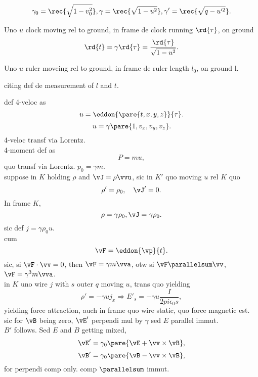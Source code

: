 \documentclass{ctexart}
\begin{document}
\[ \gamma_0 = \rec{\sqrt{1-v_0^2}}, \gamma = \rec{\sqrt{1-u^2}}, \gamma' = \rec{\sqrt{q-u'^2}}. \]
\begin{ex}
	Uno $u$ clock moving rel to ground, in frame de clock running $\rd{\tau}$, on ground
	\[ \rd{t} = \gamma \rd{\tau} = \frac{\rd{\tau}}{\sqrt{1-u^2}}. \]
\end{ex}
\begin{ex}
	Uno $u$ ruler moveing rel to ground, in frame de ruler length $l_0$, on ground l.
\end{ex}
\begin{remark}
	citing def de measurement of $l$ and $t$.
\end{remark}
def 4-veloc as
\[ u = \eddon{\pare{t,x,y,z}}{\tau}. \]
\[ u = \gamma\pare{1, v_x,v_y,v_z}. \]
4-veloc transf via Lorentz.
\\
4-moment def as
\[ P = mu, \]
quo transf via Lorentz. $p_0 = \gamma m$.
\\
suppose in $K$ holding $\rho$ and $\vJ = \rho \vvu$, sic in $K'$ quo moving $u$ rel $K$ quo
\[ \rho' = \rho_0,\quad \vJ' = 0. \]
In frame $K$,
\[ \rho = \gamma \rho_0, \vJ = \gamma \rho_0. \]
sic def $j = \gamma\rho_0 u$.
\\
cum
\[ \vF = \eddon{\vp}{t}. \]
sic, si $\vF\cdot\vv = 0$, then $\vF = \gamma m\vva$, otw si $\vF\parallelsum\vv$, $\vF = \gamma^3 m\vva$.
\\
in $K$ uno wire $j$ with $s$ outer $q$ moving $u$, trans quo yielding
\[ \rho' = -\gamma u j_x \Rightarrow E'_s = -\gamma u \frac{I}{2pi \epsilon_0 s}, \]
yielding force attraction, auch in frame quo wire static, quo force magnetic est.
\\
sic	for $\vB$ being zero, $\vE'$ perpendi mul by $\gamma$ sed $E$ parallel immut.
\\
$B'$ follows. Sed $E$ and $B$ getting mixed,
\[ \vE' = \gamma_0 \pare{\vE + \vv\times\vB}, \]
\[ \vB' = \gamma_0 \pare{\vB - \vv\times\vB}, \]
for perpendi comp only. comp $\parallelsum$ immut.

\end{document}
